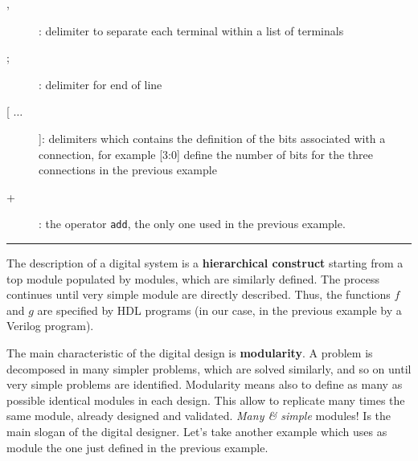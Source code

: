 \begin{verisum}
{\begin{description}
\item[,]: delimiter to separate each terminal within a list of
terminals

\item[;]: delimiter for end of line

\item[[ $ \dots$ ]]: delimiters which contains the definition of
the bits associated with a connection, for example [3:0] define
the number of bits for the three connections in the previous
example

\item[+]: the operator {\tt add}, the only one used in the
previous example.
\end{description}
\rule[5mm]{16cm}{0.25mm}
}
\end{verisum}

The description of a digital system is a {\bf hierarchical
construct} starting from a top module populated by modules, which
are similarly defined. The process continues until very simple
module are directly described. Thus, the functions $f$ and $g$ are specified by HDL programs
(in our case, in the previous example by a Verilog program).

The main characteristic of the digital design is {\bf modularity}. A
problem is decomposed in many simpler problems, which are solved
similarly, and so on until very simple problems are identified.
Modularity means also to define as many as possible identical
modules in each design. This allow to replicate many times the
same module, already designed and validated. {\em Many \& simple}
modules! Is the main slogan of the digital designer. Let's take
another example which uses as module the one just defined in the
previous example.

